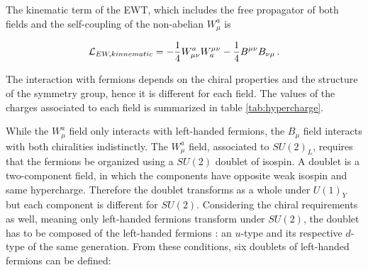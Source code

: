 The kinematic term of the EWT, which includes the free propagator of both fields and the self-coupling of the non-abelian $W_{\mu}^a$ is

\begin{equation}
    \Lagr_{EW,kinnematic} = -\frac{1}{4}W_{\mu\nu}^a W^{\mu\nu}_a - \frac{1}{4} B^{\mu\nu}B_{\nu\mu} \mend
\end{equation}

The interaction with fermions depends on the chiral properties and the structure of the symmetry group, hence it is different for each field. The values of the charges associated to each field is summarized in table \ref{tab:hypercharge}.

\begin{table}[h]
    \centering
    \caption{Values of the electroweak charges (weak isospin $I_3$, hypercharge $Y$ and electromagnetic charge $Q$) for the fermions, according to their type and chirality.}
    \label{tab:hypercharge}
\end{table}

While the $W_{\mu}^a$ field only interacts with left-handed fermions, the $B_{\mu}$ field interacts with both chiralities indistinctly.
The $W_{\mu}^a$ field, associated to $SU(2)_L$, requires that the fermions be organized using a $SU(2)$ doublet of isospin. A doublet is a two-component field, in which the components have opposite weak isospin and same hypercharge. Therefore the doublet transforms as a whole under $U(1)_Y$ but each component is different for $SU(2)$. Considering the chiral requirements as well, meaning only left-handed fermions transform under $SU(2)$, the doublet has to be composed of the left-handed fermions : an $u$-type and its respective $d$-type of the same generation. From these conditions, six doublets of left-handed fermions can be defined:

